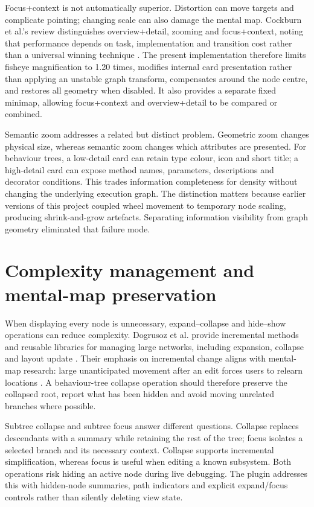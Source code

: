 Focus+context is not automatically superior. Distortion can move targets and complicate pointing; changing scale can also damage the mental map. Cockburn et al.'s review distinguishes overview+detail, zooming and focus+context, noting that performance depends on task, implementation and transition cost rather than a universal winning technique \parencite{cockburn2008review}. The present implementation therefore limits fisheye magnification to 1.20 times, modifies internal card presentation rather than applying an unstable graph transform, compensates around the node centre, and restores all geometry when disabled. It also provides a separate fixed minimap, allowing focus+context and overview+detail to be compared or combined.

Semantic zoom addresses a related but distinct problem. Geometric zoom changes physical size, whereas semantic zoom changes which attributes are presented. For behaviour trees, a low-detail card can retain type colour, icon and short title; a high-detail card can expose method names, parameters, descriptions and decorator conditions. This trades information completeness for density without changing the underlying execution graph. The distinction matters because earlier versions of this project coupled wheel movement to temporary node scaling, producing shrink-and-grow artefacts. Separating information visibility from graph geometry eliminated that failure mode.

\section{Complexity management and mental-map preservation}

When displaying every node is unnecessary, expand--collapse and hide--show operations can reduce complexity. Dogrusoz et al. provide incremental methods and reusable libraries for managing large networks, including expansion, collapse and layout update \parencite{dogrusoz2018complexity}. Their emphasis on incremental change aligns with mental-map research: large unanticipated movement after an edit forces users to relearn locations \parencite{misue1995mentalmap}. A behaviour-tree collapse operation should therefore preserve the collapsed root, report what has been hidden and avoid moving unrelated branches where possible.

Subtree collapse and subtree focus answer different questions. Collapse replaces descendants with a summary while retaining the rest of the tree; focus isolates a selected branch and its necessary context. Collapse supports incremental simplification, whereas focus is useful when editing a known subsystem. Both operations risk hiding an active node during live debugging. The plugin addresses this with hidden-node summaries, path indicators and explicit expand/focus controls rather than silently deleting view state.

